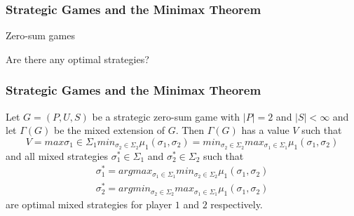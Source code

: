 \documentclass{beamer}
\begin{document}
\begin{frame}
  
  \frametitle{Strategic Games and the Minimax Theorem}

  Zero-sum games

\begin{table}[h!]
  \begin{center}
    \end{center}
  \end{table}

Are there any optimal strategies?

\end{frame}

\begin{frame}
  
\frametitle{Strategic Games and the Minimax Theorem}

\begin{theorem}[Minimax]
Let $G = (P,U,S)$ be a strategic zero-sum game with $|P| = 2$ and $|S|
< \infty$ and let $\Gamma (G)$ be the mixed extension of $G$. Then
$\Gamma (G)$ has a value $V$ such that
\begin{equation}
  V = max{\sigma _1 \in
  \Sigma_1} min_{\sigma _2 \in \Sigma_2} \mu_1(\sigma_1,\sigma_2) = min_{\sigma _2 \in
  \Sigma_2} max_{\sigma _1 \in \Sigma_1} \mu_1(\sigma_1,\sigma_2)
\end{equation}
and all mixed strategies $\sigma _1^* \in \Sigma_1$ and $\sigma _2^*
\in \Sigma_2$ such that
\begin{equation}
  \begin{gathered}
\sigma_1^* = argmax_{\sigma _1 \in
  \Sigma_1} min_{\sigma _2 \in \Sigma_2} \mu_1(\sigma_1,\sigma_2)\\
 \sigma_2^* = argmin_{\sigma _2 \in \Sigma_2} max_{\sigma _1 \in
   \Sigma_1} \mu_1(\sigma_1,\sigma_2)
\end{gathered}
\end{equation}
 are optimal mixed strategies for player $1$ and $2$ respectively.
\end{theorem}

\end{frame}
\end{document}
